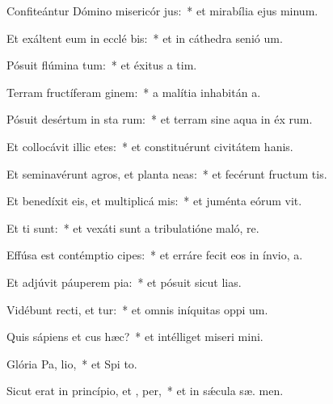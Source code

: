 \item Confiteántur Dómino misericór jus:~* et mirabília ejus  minum.
\item Et exáltent eum in ecclé bis:~* et in cáthedra senió  um.
\item Pósuit flúmina  tum:~* et éxitus a  tim.
\item Terram fructíferam  ginem:~* a malítia inhabitán  a.
\item Pósuit desértum in sta rum:~* et terram sine aqua in éx rum.
\item Et collocávit illic etes:~* et constituérunt civitátem hanis.
\item Et seminavérunt agros, et planta neas:~* et fecérunt fructum tis.
\item Et benedíxit eis, et multiplicá  mis:~* et juménta eórum  vit.
\item Et  ti sunt:~* et vexáti sunt a tribulatióne maló,  re.
\item Effúsa est contémptio  cipes:~* et erráre fecit eos in ínvio,    a.
\item Et adjúvit páuperem  pia:~* et pósuit sicut  lias.
\item Vidébunt recti, et tur:~* et omnis iníquitas oppi  um.
\item Quis sápiens et cus hæc?~* et intélliget miseri mini.
\item Glória Pa,  lio,~* et Spi to.
\item Sicut erat in princípio, et ,  per,~* et in sǽcula sæ. men.
